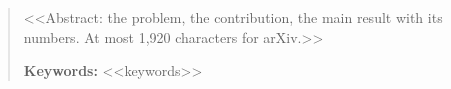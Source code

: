 \begin{abstract}
<<Abstract: the problem, the contribution, the main result with its numbers. At most 1,920 characters for arXiv.>>

\medskip
\noindent\textbf{Keywords:} <<keywords>>
\end{abstract}
